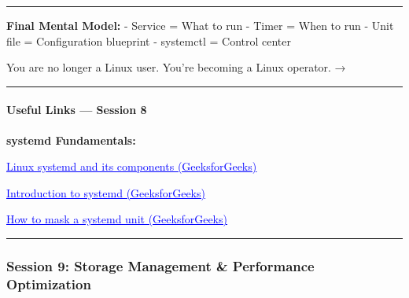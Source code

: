 \documentclass[
  english,
  paper=a4,
  oneside  ,captions=tableheading
]{scrartcl}
\renewenvironment{quote}{\begin{customblockquote}\list{}{\rightmargin=0em\leftmargin=0em}%
\item\relax\color{blockquote-text}\ignorespaces}{\unskip\unskip\endlist\end{customblockquote}}
\begin{document}
\begin{center}\rule{0.5\linewidth}{0.5pt}\end{center}

\textbf{Final Mental Model:} - Service = What to run - Timer = When to
run - Unit file = Configuration blueprint - systemctl = Control center

\begin{quote}
You are no longer a Linux user. You're becoming a Linux operator. →
\end{quote}

\begin{center}\rule{0.5\linewidth}{0.5pt}\end{center}

\paragraph{Useful Links --- Session 8}\label{useful-links-session-8}

\textbf{systemd Fundamentals:}

%
  \par\vspace{0.5ex}%
  \href{https://www.geeksforgeeks.org/linux-unix/linux-systemd-and-its-components/}{\textcolor{blue}{\underline{\faLink\quad Linux systemd and its components (GeeksforGeeks)}}}%
  \par\vspace{0.5ex}%

%
  \par\vspace{0.5ex}%
  \href{https://www.geeksforgeeks.org/linux-unix/an-introduction-to-systemd-and-its-role-in-the-boot-process/}{\textcolor{blue}{\underline{\faLink\quad Introduction to systemd (GeeksforGeeks)}}}%
  \par\vspace{0.5ex}%

%
  \par\vspace{0.5ex}%
  \href{https://www.geeksforgeeks.org/linux-unix/how-to-mask-a-systemd-unit-in-linux/}{\textcolor{blue}{\underline{\faLink\quad How to mask a systemd unit (GeeksforGeeks)}}}%
  \par\vspace{0.5ex}%

\begin{center}\rule{0.5\linewidth}{0.5pt}\end{center}

\subsubsection{Session 9: Storage Management \& Performance
Optimization}\label{session-9-storage-management-performance-optimization}
\end{document}
